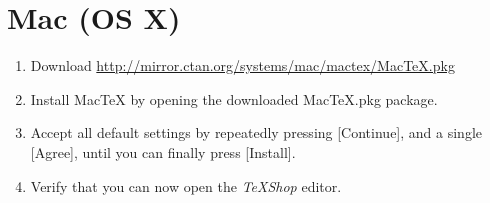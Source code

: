 \documentclass[a4paper, 12pt]{article}
\begin{document}
\section{Mac (OS X)}
\label{sec:mac}
\begin{enumerate}
	\item Download \url{http://mirror.ctan.org/systems/mac/mactex/MacTeX.pkg}
	\item Install MacTeX by opening the downloaded MacTeX.pkg package.
	\item Accept all default settings by repeatedly pressing [Continue], and a single [Agree], until you can finally press [Install].
	\item Verify that you can now open the \emph{TeXShop} editor.
\end{enumerate}
\end{document}

